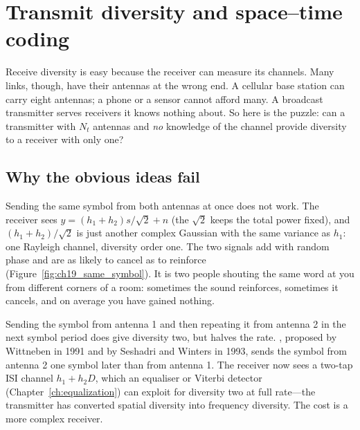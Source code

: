 
\section{Transmit diversity and space--time coding}
\label{sec:ch19:stc}

Receive diversity is easy because the receiver can measure its channels. Many links, though, have
their antennas at the wrong end. A cellular base station can carry eight antennas; a phone or a
sensor cannot afford many. A broadcast transmitter serves receivers it knows nothing about. So here
is the puzzle: can a transmitter with $N_t$ antennas and \emph{no} knowledge of the channel provide
diversity to a receiver with only one?

\subsection{Why the obvious ideas fail}

Sending the same symbol from both antennas at once does not work. The receiver sees
$y=(h_1+h_2)s/\sqrt2+n$ (the $\sqrt2$ keeps the total power fixed), and $(h_1+h_2)/\sqrt2$ is just
another complex Gaussian with the same variance as $h_1$: one Rayleigh channel, diversity order
one. The two signals add with random phase and are as likely to cancel as to reinforce
(Figure~\ref{fig:ch19_same_symbol}). It is two people shouting the same word at you from different
corners of a room: sometimes the sound reinforces, sometimes it cancels, and on average you have
gained nothing.


Sending the symbol from antenna 1 and then repeating it from antenna 2 in the next symbol period
does give diversity two, but halves the rate. , proposed by Wittneben in 1991
and by Seshadri and Winters in 1993, sends the symbol from antenna 2 one symbol later than from
antenna 1. The receiver now sees a two-tap ISI channel $h_1+h_2D$, which an equaliser or Viterbi
detector (Chapter~\ref{ch:equalization}) can exploit for diversity two at full rate---the
transmitter has converted spatial diversity into frequency diversity. The cost is a more complex
receiver.

